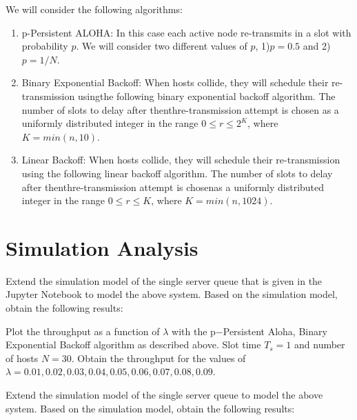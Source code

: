 \documentclass{article}
\begin{document}
We will consider the following algorithms:

\begin{enumerate}
    \item p-Persistent ALOHA: In this case each active node re-transmits in a slot with probability $p$.
          We will consider two different values of $p$, 1)$p= 0.5$ and 2)$p=1/N$.
    \item Binary Exponential Backoff: When hosts collide, they will schedule their re-transmission usingthe following binary exponential backoff algorithm.
          The number of slots to delay after thenthre-transmission attempt is chosen as a uniformly distributed integer in the range $0 \le r \le 2^K$, where $K= min(n,10)$.
    \item Linear Backoff: When hosts collide, they will schedule their re-transmission using the following linear backoff algorithm.
          The number of slots to delay after thenthre-transmission attempt is chosenas a uniformly distributed integer in the range $0 \le r \le K$, where $K= min(n,1024)$.
\end{enumerate}

\section{Simulation Analysis}
Extend the simulation model of the single server queue that is given in the Jupyter Notebook to model the above system.
Based on the simulation model, obtain the following results:

Plot  the  throughput  as  a  function  of $\lambda$ with  the p−Persistent  Aloha,  Binary  Exponential  Backoff algorithm as described above.
Slot time $T_s= 1$ and number of hosts $N = 30$.
Obtain the throughput for the values of $\lambda = 0.01,0.02,0.03,0.04,0.05,0.06,0.07,0.08,0.09$.

Extend the simulation model of the single server queue to model the above system.
Based on the simulation model, obtain the following results:
\end{document}
